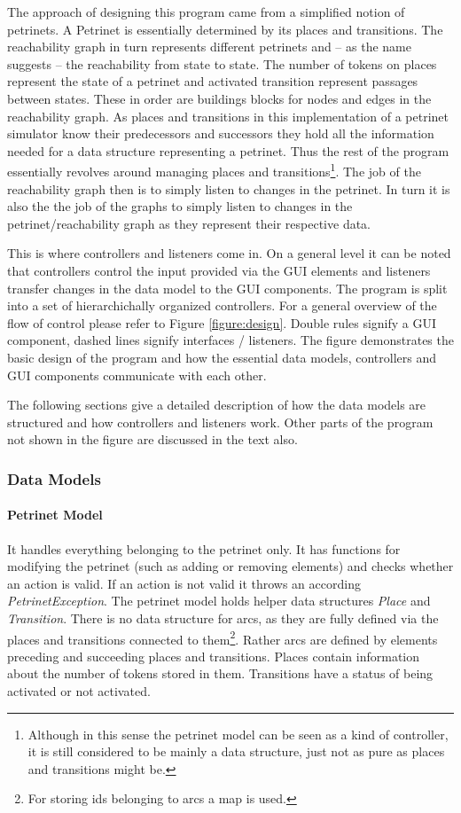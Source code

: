 \documentclass[10pt, a4paper]{article}
\begin{document}
The approach of designing this program came from a simplified notion of petrinets. A Petrinet is essentially determined by its places and transitions. The reachability graph in turn represents different petrinets and -- as the name suggests -- the reachability from state to state. The number of tokens on places represent the state of a petrinet and activated transition represent passages between states. These in order are buildings blocks for nodes and edges in the reachability graph. As places and transitions in this implementation of a petrinet simulator know their predecessors and successors they hold all the information needed for a data structure representing a petrinet. Thus the rest of the program essentially revolves around managing places and transitions\footnote{Although in this sense the petrinet model can be seen as a kind of controller, it is still considered to be mainly a data structure, just not as pure as places and transitions might be.}. The job of the reachability graph then is to simply listen to changes in the petrinet. In turn it is also the the job of the graphs to simply listen to changes in the petrinet/reachability graph as they represent their respective data. 

This is where controllers and listeners come in. On a general level it can be noted that controllers control the input provided via the GUI elements and listeners transfer changes in the data model to the GUI components. The program is split into a set of hierarchichally organized controllers. For a general overview of the flow of control please refer to Figure \ref{figure:design}. Double rules signify a GUI component, dashed lines signify interfaces / listeners. The figure demonstrates the basic design of the program and how the essential data models, controllers and GUI components communicate with each other. 

The following sections give a detailed description of how the data models are structured and how controllers and listeners work. Other parts of the program not shown in the figure are discussed in the text also.



\subsubsection{Data Models}

\paragraph{Petrinet Model} It handles everything belonging to the petrinet only. It has functions for modifying the petrinet (such as adding or removing elements) and checks whether an action is valid. If an action is not valid it throws an according \textit{PetrinetException}. The petrinet model holds helper data structures \textit{Place} and \textit{Transition}. There is no data structure for arcs, as they are fully defined via the places and transitions connected to them\footnote{For storing ids belonging to arcs a map is used.}. Rather arcs are defined by elements preceding and succeeding places and transitions. Places contain information about the number of tokens stored in them. Transitions have a status of being activated or not activated.   
\end{document}
